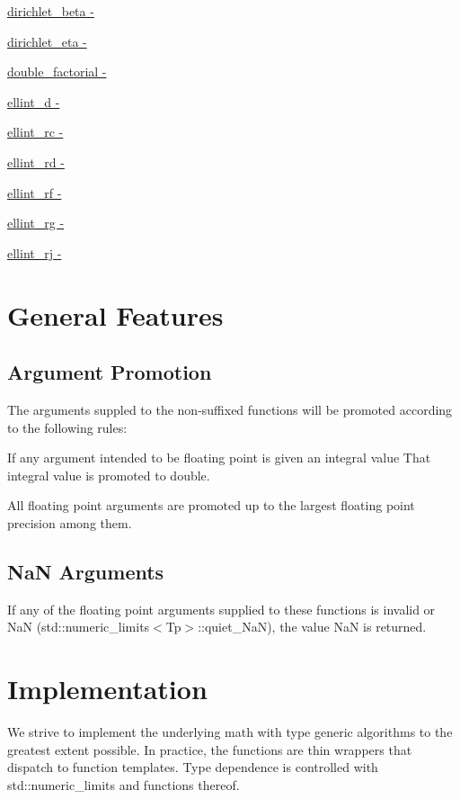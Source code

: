 \begin{DoxyItemize}
\item \hyperlink{group__gnu__math__spec__func_ga87466a2d429a2815d794acc21c882b08}{dirichlet\+\_\+beta -\/ }
\item \hyperlink{group__gnu__math__spec__func_gae46e26e4107675d285c79a2d6202e6c7}{dirichlet\+\_\+eta -\/ }
\item \hyperlink{group__gnu__math__spec__func_ga206cdf1ae7f9a0df3048af18892b8ba8}{double\+\_\+factorial -\/ }
\item \hyperlink{group__gnu__math__spec__func_ga6a594ffefbe4f238f98fa2190b03795f}{ellint\+\_\+d -\/ }
\item \hyperlink{group__gnu__math__spec__func_ga183d78859b56f93237567e6322164832}{ellint\+\_\+rc -\/ }
\item \hyperlink{group__gnu__math__spec__func_ga812c4f543575006c6b555d1385b88d90}{ellint\+\_\+rd -\/ }
\item \hyperlink{group__gnu__math__spec__func_gad276bd7533a87ca6d658cebc00a11b0a}{ellint\+\_\+rf -\/ }
\item \hyperlink{group__gnu__math__spec__func_ga9d3d53ace67dfa6126118fb780095a1f}{ellint\+\_\+rg -\/ }
\item \hyperlink{group__gnu__math__spec__func_ga61c6d7f5b930400eeb8de455667d4292}{ellint\+\_\+rj -\/ }
\end{DoxyItemize}\hypertarget{index_general}{}\section{General Features}\label{index_general}
\hypertarget{index_promotion}{}\subsection{Argument Promotion}\label{index_promotion}
The arguments suppled to the non-\/suffixed functions will be promoted according to the following rules\+:
\begin{DoxyEnumerate}
\item If any argument intended to be floating point is given an integral value That integral value is promoted to double.
\item All floating point arguments are promoted up to the largest floating point precision among them.
\end{DoxyEnumerate}\hypertarget{index_NaN}{}\subsection{Na\+N Arguments}\label{index_NaN}
If any of the floating point arguments supplied to these functions is invalid or Na\+N (std\+::numeric\+\_\+limits$<$\+Tp$>$\+::quiet\+\_\+\+Na\+N), the value Na\+N is returned.\hypertarget{index_impl}{}\section{Implementation}\label{index_impl}
We strive to implement the underlying math with type generic algorithms to the greatest extent possible. In practice, the functions are thin wrappers that dispatch to function templates. Type dependence is controlled with std\+::numeric\+\_\+limits and functions thereof.

